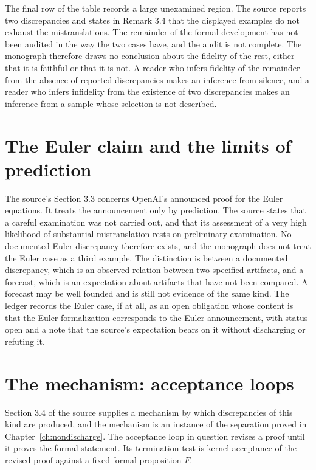 The final row of the table records a large unexamined region. The source reports two discrepancies and states in Remark 3.4 that the displayed examples do not exhaust the mistranslations. The remainder of the formal development has not been audited in the way the two cases have, and the audit is not complete. The monograph therefore draws no conclusion about the fidelity of the rest, either that it is faithful or that it is not. A reader who infers fidelity of the remainder from the absence of reported discrepancies makes an inference from silence, and a reader who infers infidelity from the existence of two discrepancies makes an inference from a sample whose selection is not described.

\section{The Euler claim and the limits of prediction}

The source's Section 3.3 concerns OpenAI's announced proof for the Euler equations. It treats the announcement only by prediction. The source states that a careful examination was not carried out, and that its assessment of a very high likelihood of substantial mistranslation rests on preliminary examination. No documented Euler discrepancy therefore exists, and the monograph does not treat the Euler case as a third example. The distinction is between a documented discrepancy, which is an observed relation between two specified artifacts, and a forecast, which is an expectation about artifacts that have not been compared. A forecast may be well founded and is still not evidence of the same kind. The ledger records the Euler case, if at all, as an open obligation whose content is that the Euler formalization corresponds to the Euler announcement, with status open and a note that the source's expectation bears on it without discharging or refuting it.

\section{The mechanism: acceptance loops}

Section 3.4 of the source supplies a mechanism by which discrepancies of this kind are produced, and the mechanism is an instance of the separation proved in Chapter~\ref{ch:nondischarge}. The acceptance loop in question revises a proof until it proves the formal statement. Its termination test is kernel acceptance of the revised proof against a fixed formal proposition $F$.

